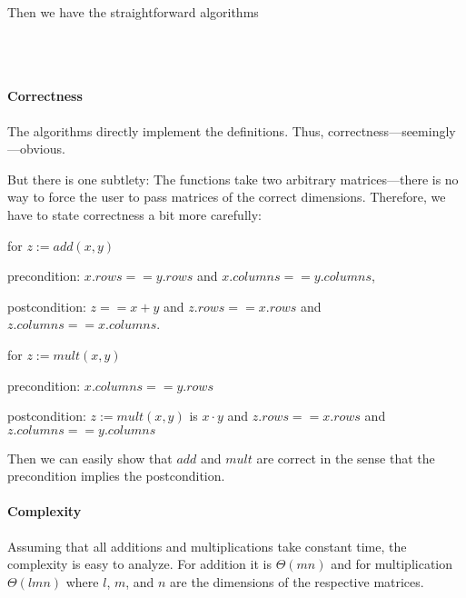 Then we have the straightforward algorithms
\begin{acode}
 \\
\\
\end{acode}

\paragraph{Correctness}
The algorithms directly implement the definitions.
Thus, correctness---seemingly---obvious.

But there is one subtlety: The functions take two arbitrary matrices---there is no way to force the user to pass matrices of the correct dimensions.
Therefore, we have to state correctness a bit more carefully:
\begin{compactitem}
 \item for $z:=add(x,y)$
   \begin{compactitem}
     \item[precondition:] $x.rows==y.rows$ and $x.columns==y.columns$,
     \item[postcondition:] $z==x+y$ and $z.rows==x.rows$ and $z.columns==x.columns$.
   \end{compactitem}
 \item for $z:=mult(x,y)$
   \begin{compactitem}
     \item[precondition:]  $x.columns==y.rows$
     \item[postcondition:] $z:=mult(x,y)$ is $x\cdot y$ and $z.rows==x.rows$ and $z.columns==y.columns$
   \end{compactitem}
\end{compactitem}
Then we can easily show that $add$ and $mult$ are correct in the sense that the precondition implies the postcondition.

\paragraph{Complexity}
Assuming that all additions and multiplications take constant time, the complexity is easy to analyze.
For addition it is $\Theta(mn)$ and for multiplication $\Theta(lmn)$ where $l$, $m$, and $n$ are the dimensions of the respective matrices.

